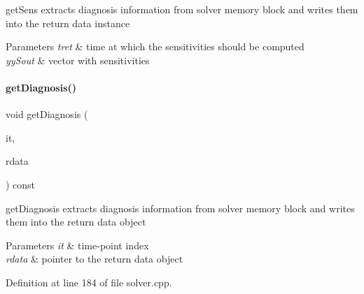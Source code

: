 get\+Sens extracts diagnosis information from solver memory block and writes them into the return data instance


\begin{DoxyParams}{Parameters}
{\em tret} & time at which the sensitivities should be computed \\
\hline
{\em yy\+Sout} & vector with sensitivities \\
\hline
\end{DoxyParams}
\mbox{\label{classamici_1_1_solver_a07318808fed3463ea8de7f25e3698343}} 
\paragraph{\texorpdfstring{get\+Diagnosis()}{getDiagnosis()}}
{\footnotesize\ttfamily void get\+Diagnosis (\begin{DoxyParamCaption}\item[{const int}]{it,  }\item[{\mbox{\hyperlink{classamici_1_1_return_data}{Return\+Data}} $\ast$}]{rdata }\end{DoxyParamCaption}) const}

get\+Diagnosis extracts diagnosis information from solver memory block and writes them into the return data object


\begin{DoxyParams}{Parameters}
{\em it} & time-\/point index \\
\hline
{\em rdata} & pointer to the return data object \\
\hline
\end{DoxyParams}


Definition at line 184 of file solver.\+cpp.

